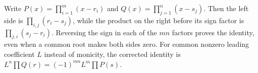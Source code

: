 Write $P(x)=\prod_{i=1}^m(x-r_i)$ and $Q(x)=\prod_{j=1}^n(x-s_j)$. Then the left side is $\prod_{i,j}(r_i-s_j)$, while the product on the right before its sign factor is $\prod_{j,i}(s_j-r_i)$. Reversing the sign in each of the $mn$ factors proves the identity, even when a common root makes both sides zero. For common nonzero leading coefficient $L$ instead of monicity, the corrected identity is $L^n\prod Q(r)=(-1)^{mn}L^m\prod P(s)$.
